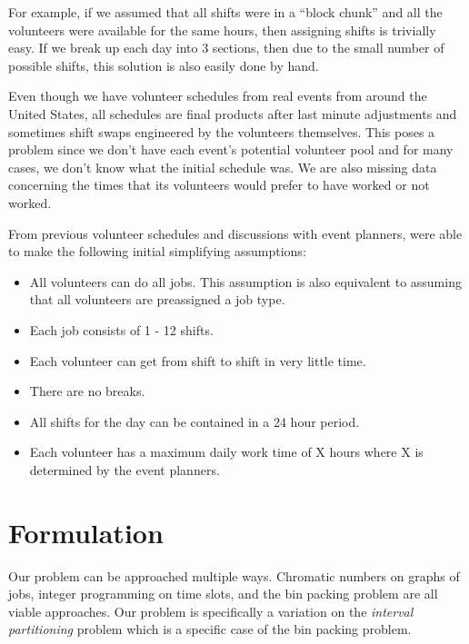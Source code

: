 \documentclass[11pt]{article}
\theoremstyle{definition}
\begin{document}
\begin{multicols}{2}
For example, if we assumed that all shifts were in a ``block chunk'' and all the volunteers were available for the same hours, then assigning shifts is trivially easy.
If we break up each day into 3 sections, then due to the small number of possible shifts, this solution is also easily done by hand.

Even though we have volunteer schedules from real events from around the United States, all schedules are final products after last minute adjustments and sometimes shift swaps engineered by the volunteers themselves.
This poses a problem since we don't have each event's potential volunteer pool and for many cases, we don't know what the initial schedule was.
We are also missing data concerning the times that its volunteers would prefer to have worked or not worked.

From previous volunteer schedules and discussions with event planners, were able to make the following initial simplifying assumptions:
\begin{itemize}\itemsep0pt
\item All volunteers can do all jobs. This assumption is also equivalent to assuming that all volunteers are preassigned a job type.
\item Each job consists of 1 - 12 shifts.
\item Each volunteer can get from shift to shift in very little time.
\item There are no breaks.
\item All shifts for the day can be contained in a 24 hour period.
\item Each volunteer has a maximum daily work time of X hours where X is determined by the event planners.
\end{itemize}
%
%
\section{Formulation}
Our problem can be approached multiple ways.
Chromatic numbers on graphs of jobs, integer programming on time slots, and the bin packing problem are all viable approaches.
Our problem is specifically a variation on the \textit{interval partitioning} problem which is a specific case of the bin packing problem.


\end{multicols}
\end{document}
